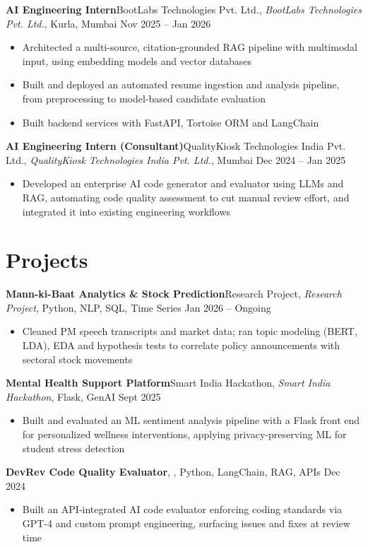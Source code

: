 \documentclass[10pt,a4paper]{article}
\newcommand{\job}[4]{\textbf{#1}\ifx\relax#2\relax\else, \textit{#2}\fi, #3 \hfill #4\par\vspace{-1pt}}
\begin{document}
\job{AI Engineering Intern}{BootLabs Technologies Pvt. Ltd.}{Kurla, Mumbai}{Nov 2025 -- Jan 2026}
\begin{itemize}
  \item Architected a multi-source, citation-grounded RAG pipeline with multimodal input, using embedding models and vector databases
  \item Built and deployed an automated resume ingestion and analysis pipeline, from preprocessing to model-based candidate evaluation
  \item Built backend services with FastAPI, Tortoise ORM and LangChain
\end{itemize}

\job{AI Engineering Intern (Consultant)}{QualityKiosk Technologies India Pvt. Ltd.}{Mumbai}{Dec 2024 -- Jan 2025}
\begin{itemize}
  \item Developed an enterprise AI code generator and evaluator using LLMs and RAG, automating code quality assessment to cut manual review effort, and integrated it into existing engineering workflows
\end{itemize}

\section*{Projects}

\job{Mann-ki-Baat Analytics \& Stock Prediction}{Research Project}{Python, NLP, SQL, Time Series}{Jan 2026 -- Ongoing}
\begin{itemize}
  \item Cleaned PM speech transcripts and market data; ran topic modeling (BERT, LDA), EDA and hypothesis tests to correlate policy announcements with sectoral stock movements
\end{itemize}

\job{Mental Health Support Platform}{Smart India Hackathon}{Flask, GenAI}{Sept 2025}
\begin{itemize}
  \item Built and evaluated an ML sentiment analysis pipeline with a Flask front end for personalized wellness interventions, applying privacy-preserving ML for student stress detection
\end{itemize}

\job{DevRev Code Quality Evaluator}{}{Python, LangChain, RAG, APIs}{Dec 2024}
\begin{itemize}
  \item Built an API-integrated AI code evaluator enforcing coding standards via GPT-4 and custom prompt engineering, surfacing issues and fixes at review time
\end{itemize}
\end{document}
